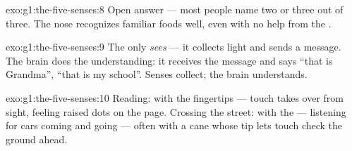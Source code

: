 \begin{solution}{exo:g1:the-five-senses:8}
Open answer --- most people name two or three out of three. The
nose recognizes familiar foods well, even with no help from the
.
\end{solution}

\begin{solution}{exo:g1:the-five-senses:9}
The  only \emph{sees} --- it collects light and sends a message.
The brain does the understanding: it receives the message and says
``that is Grandma'', ``that is my school''. Senses collect; the
brain understands.
\end{solution}

\begin{solution}{exo:g1:the-five-senses:10}
Reading: with the fingertips --- touch takes over from sight,
feeling raised dots on the page. Crossing the street: with the
 --- listening for cars coming and going --- often with a cane
whose tip lets touch check the ground ahead.
\end{solution}
